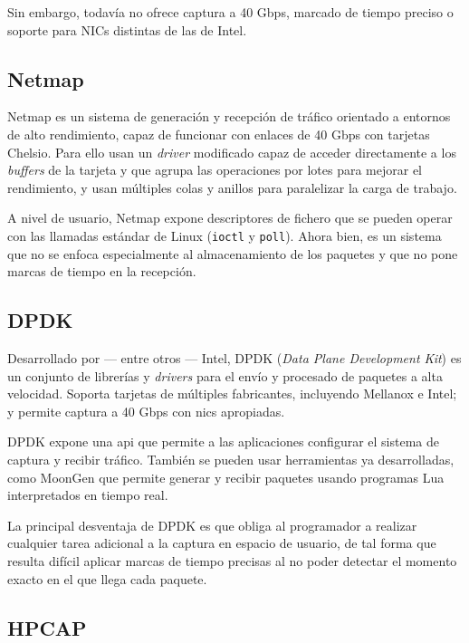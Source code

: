 \documentclass[twoside, 12pt]{epstfg}
\begin{document}
Sin embargo, todavía no ofrece captura a 40 Gbps, marcado de tiempo preciso o soporte para NICs distintas de las de Intel.

\subsection{Netmap}

Netmap \cite{rizzo2012netmap} es un sistema de generación y recepción de tráfico orientado a entornos de alto rendimiento, capaz de funcionar con enlaces de 40 Gbps con tarjetas Chelsio. Para ello usan un \textit{driver} modificado capaz de acceder directamente a los \textit{buffers} de la tarjeta y que agrupa las operaciones por lotes para mejorar el rendimiento, y usan múltiples colas y anillos para paralelizar la carga de trabajo.

A nivel de usuario, Netmap expone descriptores de fichero que se pueden operar con las llamadas estándar de Linux (\texttt{ioctl} y \texttt{poll}). Ahora bien, es un sistema que no se enfoca especialmente al almacenamiento de los paquetes y que no pone marcas de tiempo en la recepción.

\subsection{DPDK}

Desarrollado por --- entre otros --- Intel, DPDK (\textit{Data Plane Development Kit}) \cite{IntelDPDK} es un conjunto de librerías y \textit{drivers} para el envío y procesado de paquetes a alta velocidad. Soporta tarjetas de múltiples fabricantes, incluyendo Mellanox e Intel; y permite captura a 40 Gbps con \glspl{nic} apropiadas.

DPDK expone una \gls{api} que permite a las aplicaciones configurar el sistema de captura y recibir tráfico. También se pueden usar herramientas ya desarrolladas, como MoonGen \cite{emmerich2015moongen} que permite generar y recibir paquetes usando programas Lua interpretados en tiempo real.

La principal desventaja de DPDK es que obliga al programador a realizar cualquier tarea adicional a la captura en espacio de usuario, de tal forma que resulta difícil aplicar marcas de tiempo precisas al no poder detectar el momento exacto en el que llega cada paquete.

\subsection{HPCAP}
\label{sec:EstadoArte:HPCAP}
\end{document}
